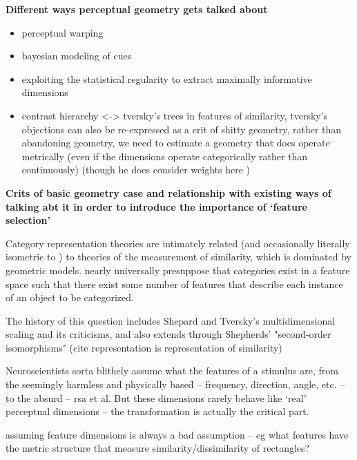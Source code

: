 \begin{multicols}{2}
\begin{itemize}
\end{itemize}

\textbf{Different ways perceptual geometry gets talked about}
\begin{itemize}
	\item perceptual warping
	\item bayesian modeling of cues
	\item exploiting the statistical regularity to extract maximally informative dimensions
	\item contrast hierarchy <-> tversky's trees in features of similarity, tversky's objections can also be re-expressed as a crit of shitty geometry, rather than abandoning geometry, we need to estimate a geometry that does operate metrically (even if the dimensions operate categorically rather than continuously) (though he does consider weights here \cite{ritovDifferentialWeightingCommon1990})
\end{itemize}

\textbf{Crits of basic geometry case and relationship with existing ways of talking abt it in order to introduce the importance of `feature selection'}


Category representation theories are intimately related (and occasionally literally isometric to \cite{Edelman1998}) to theories of the measurement of similarity, which is dominated by geometric models\cite{Tversky1977}. nearly universally presuppose that categories exist in a feature space such that there exist some number of features that describe each instance of an object to be categorized.

The history of this question includes Shepard and Tversky's multidimensional scaling and its criticisms, and also extends through Shepherds' "second-order isomorphisms" (cite representation is representation of similarity)

Neuroscientists sorta blithely assume what the features of a stimulus are, from the seemingly harmless and physically based -- frequency, direction, angle, etc. -- to the absurd -- rsa et al. But these dimensions rarely behave like `real' perceptual dimensions \cite{krantzSimilarityRectanglesAnalysis1975a} -- the transformation is actually the critical part. 

assuming feature dimensions is always a bad assumption -- eg what features have the metric structure that measure similarity/dissimilarity of rectangles? \cite{krantzSimilarityRectanglesAnalysis1975a}


\end{multicols}
